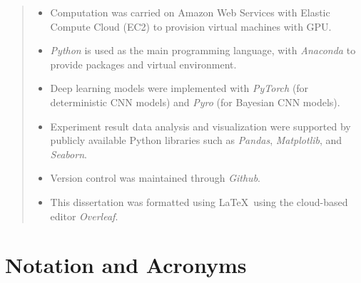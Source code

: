 \documentclass[ %
                    author={Revalda Putawara},
                supervisor={Dr. James Pope},
                    degree={MSc},
                     title={Robustness of Bayesian Neural Networks Design Choices Against Weight and Bias Perturbation Induced by Single Event Upsets (SEUs)},
                      type={},
                      year={2025}]{dissertation}
\begin{document}
\begin{quote}
\noindent
\begin{itemize}

\item Computation was carried on Amazon Web Services with Elastic Compute Cloud (EC2) to provision virtual machines with GPU.

\item {\em Python} is used as the main programming language, with {\em Anaconda} to provide packages and virtual environment.

\item Deep learning models were implemented with {\em PyTorch} (for deterministic CNN models) and  {\em Pyro} (for Bayesian CNN models).

\item Experiment result data analysis and visualization were supported by publicly available Python libraries such as {\em Pandas}, {\em Matplotlib}, and {\em Seaborn}.

\item Version control was maintained through {\em Github}.
 
\item This dissertation was formatted using \LaTeX\ using the cloud-based editor {\em Overleaf}. 
\end{itemize}
\end{quote}


\chapter*{Notation and Acronyms}



\end{document}

